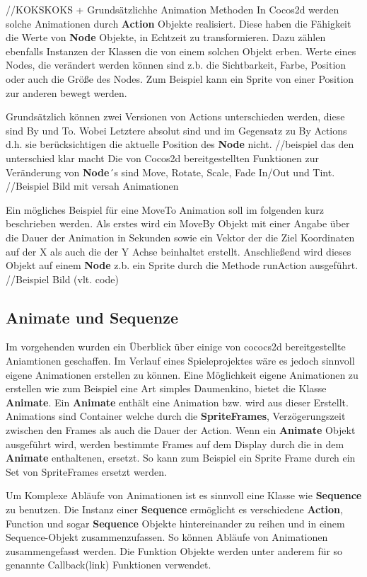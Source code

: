 //KOKSKOKS + Grundsätzlichhe Animation Methoden
In Cocos2d werden solche Animationen durch \textbf{Action} Objekte realisiert. Diese haben die Fähigkeit die Werte von \textbf{Node} Objekte, in Echtzeit zu transformieren. Dazu zählen ebenfalls Instanzen der Klassen die von einem solchen Objekt erben. Werte eines Nodes, die verändert werden können sind z.b. die Sichtbarkeit, Farbe, Position oder auch die Größe des Nodes. Zum Beispiel kann ein Sprite von einer Position zur anderen bewegt werden.

Grundsätzlich können zwei Versionen von Actions unterschieden werden, diese sind By und To. Wobei Letztere absolut sind und im Gegensatz zu By Actions d.h. sie berücksichtigen  die aktuelle Position des \textbf{Node} nicht. //beispiel das den unterschied klar macht  Die von Cocos2d bereitgestellten Funktionen zur Veränderung von \textbf{Node}´s sind Move, Rotate, Scale, Fade In/Out und Tint. 
//Beispiel Bild mit versah Animationen 

Ein mögliches Beispiel für eine MoveTo Animation soll im folgenden kurz beschrieben werden.
Als erstes wird ein MoveBy Objekt mit einer Angabe über die Dauer der Animation in Sekunden sowie ein Vektor der die Ziel Koordinaten auf der X als auch die der Y Achse beinhaltet erstellt. Anschließend wird dieses Objekt auf einem \textbf{Node} z.b. ein Sprite durch die Methode runAction ausgeführt. 
//Beispiel Bild (vlt. code)



\subsection{Animate und Sequenze}
Im vorgehenden wurden ein Überblick über einige von cococs2d bereitgestellte Aniamtionen geschaffen. Im Verlauf eines Spieleprojektes wäre es jedoch sinnvoll eigene Animationen erstellen zu können. Eine Möglichkeit eigene Animationen zu erstellen wie zum Beispiel eine Art simples Daumenkino, bietet die Klasse \textbf{Animate}. Ein \textbf{Animate} enthält eine Animation bzw. wird aus dieser Erstellt. Animations sind Container welche durch die \textbf{SpriteFrames}, Verzögerungszeit zwischen den Frames als auch die Dauer der Action. Wenn ein \textbf{Animate} Objekt ausgeführt wird, werden bestimmte Frames auf dem Display durch die in dem \textbf{Animate} enthaltenen, ersetzt. So kann zum Beispiel ein Sprite Frame durch ein Set von SpriteFrames ersetzt werden.

Um Komplexe Abläufe von Animationen ist es sinnvoll eine Klasse wie \textbf{Sequence} zu benutzen. Die Instanz einer \textbf{Sequence} ermöglicht es verschiedene \textbf{Action}, Function und sogar \textbf{Sequence} Objekte hintereinander zu reihen und in einem Sequence-Objekt zusammenzufassen. So können Abläufe von Animationen zusammengefasst werden. 
Die Funktion Objekte werden unter anderem für so genannte Callback(link) Funktionen verwendet. 

